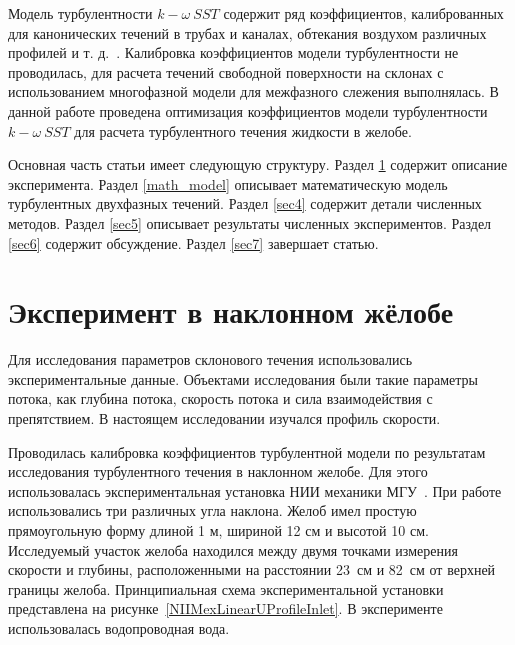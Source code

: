 \documentclass[mathematics,article,accept,pdftex,moreauthors]{Definitions/mdpi}
\begin{document}
Модель турбулентности $k-\omega\ SST$ содержит ряд коэффициентов, калиброванных для канонических течений в трубах и каналах, обтекания воздухом различных профилей и т. д.~\cite{LaunderSpalding1974, Tahry1983, LaunderMorseRodiSpaldiug1972}. Калибровка коэффициентов модели турбулентности не проводилась, для расчета течений свободной поверхности на склонах с использованием многофазной модели для межфазного слежения выполнялась. В данной работе проведена оптимизация коэффициентов модели турбулентности $k-\omega\ SST$ для расчета турбулентного течения жидкости в желобе.

Основная часть статьи имеет следующую структуру.
Раздел \ref{sec2} содержит описание эксперимента. Раздел \ref{math_model} описывает математическую модель турбулентных двухфазных течений. Раздел \ref{sec4} содержит детали численных методов.
Раздел \ref{sec5} описывает результаты численных экспериментов.
Раздел \ref{sec6} содержит обсуждение.
Раздел \ref{sec7} завершает статью.%


\section{Эксперимент в наклонном жёлобе }\label{sec2}

Для исследования параметров склонового течения использовались экспериментальные данные. Объектами исследования были такие параметры потока, как глубина потока, скорость потока и сила взаимодействия с препятствием. В настоящем исследовании изучался профиль скорости.

Проводилась калибровка коэффициентов турбулентной модели по результатам исследования турбулентного течения в наклонном желобе. Для этого использовалась экспериментальная установка НИИ механики МГУ~\cite{fluids7030111}. При работе использовались три различных угла наклона. Желоб имел простую прямоугольную форму длиной 1 м, шириной 12 см и высотой 10 см. Исследуемый участок желоба находился между двумя точками измерения скорости и глубины, расположенными на расстоянии 23~см и 82~см от верхней границы желоба. Принципиальная схема экспериментальной установки представлена на рисунке~\ref{NIIMexLinearUProfileInlet}. В эксперименте использовалась водопроводная вода.
\end{document}
